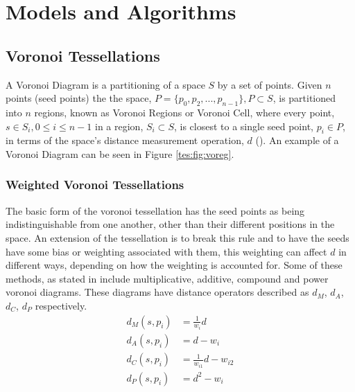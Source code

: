 \section{Models and Algorithms}\label{tes}
\subsection{Voronoi Tessellations}\label{tes:sec:vor}
A Voronoi Diagram is a partitioning of a space $S$ by a set of points. Given $n$ points (seed points) the the space, $P = \{p_0,p_2,...,p_{n-1}\}, P \subset S$, is partitioned into $n$ regions, known as Voronoi Regions or Voronoi Cell, where every point, $s \in S_i,0 \leq i \leq n-1$ in a region, $S_i \subset S$, is closest to a single seed point, $p_i \in P$, in terms of the space's distance measurement operation, $d$ (\cite{okabe2009spatial}). An example of a Voronoi Diagram can be seen in Figure \ref{tes:fig:voreg}.
%
\subsubsection{Weighted Voronoi Tessellations}\label{tes:ssec:wei}
The basic form of the voronoi tessellation has the seed points as being indistinguishable from one another, other than their different positions in the space. An extension of the tessellation is to break this rule and to have the seeds have some bias or weighting associated with them, this weighting can affect $d$ in different ways, depending on how the weighting is accounted for. Some of these methods, as stated in \cite{okabe2009spatial} include multiplicative, additive, compound and power voronoi diagrams. These diagrams have distance operators described as $d_M$, $d_A$, $d_C$, $d_P$ respectively.
%
\begin{equation}
\begin{align}
  d_M(s,p_i) &= \frac{1}{w_i}d			\\
  d_A(s,p_i) &= d - w_i				\\
  d_C(s,p_i) &= \frac{1}{w_{i1}}d - w_{i2}	\\
  d_P(s,p_i) &= d^2 - w_i			\\
\end{align}
\end{equation}
%

